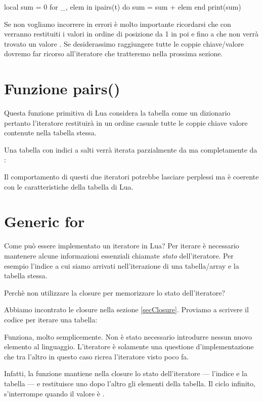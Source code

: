 local sum = 0
for _, elem in ipairs(t) do
    sum = sum + elem
end
print(sum)
\endlines
{}

Se non vogliamo incorrere in errori è molto importante ricordarsi che con
 verranno restituiti i valori in ordine di posizione da 1 in poi e
fino a che non verrà trovato un valore . Se desiderassimo raggiungere
tutte le coppie chiave/valore dovremo far ricorso all'iteratore 
che tratteremo nella prossima sezione.


\section{Funzione pairs()}

Questa funzione primitiva di Lua considera la tabella come un dizionario
pertanto l'iteratore restituirà in un ordine casuale tutte le coppie chiave
valore contenute nella tabella stessa.

Una tabella con indici a salti verrà iterata parzialmente da  ma
completamente da :

Il comportamento di questi due iteratori potrebbe lasciare perplessi ma è
coerente con le caratteristiche della tabella di Lua.


\section{Generic for}

Come può essere implementato un iteratore in Lua? Per iterare è necessario
mantenere alcune informazioni essenziali chiamate \emph{stato} dell'iteratore.
Per esempio l'indice a cui siamo arrivati nell'iterazione di una tabella/array
e la tabella stessa.

Perchè non utilizzare la closure per memorizzare lo stato dell'iteratore?

Abbiamo incontrato le closure nella sezione \ref{secClosure}. Proviamo a
scrivere il codice per iterare una tabella:

Funziona, molto semplicemente. Non è stato necessario introdurre nessun nuovo
elemento al linguaggio. L'iteratore è solamente una questione d'implementazione
che tra l'altro in questo caso ricrea l'iteratore  visto poco fa.

Infatti, la funzione  mantiene nella closure lo stato
dell'iteratore --- l'indice  e la tabella  --- e restituisce uno
dopo l'altro gli elementi della tabella. Il ciclo  infinito,
s'interrompe quando il valore è .

